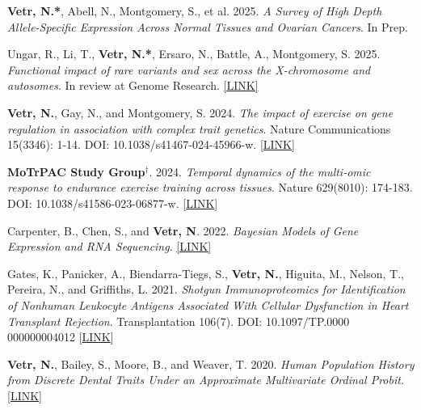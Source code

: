 \documentclass[12pt]{article}
\begin{document}
\begin{enumerate}[label={[\arabic*]}]

\item \textbf{Vetr, N.*}, Abell, N.,  Montgomery, S., et al.  2025.  \emph{A Survey of High Depth Allele-Specific Expression Across Normal Tissues and Ovarian Cancers}.  In Prep.

\item Ungar, R., Li, T., \textbf{Vetr, N.*},  Ersaro, N., Battle, A., Montgomery, S. 2025.  \emph{Functional impact of rare variants and sex across the X-chromosome and autosomes}.  In review at Genome Research.  \href{https://www.biorxiv.org/content/10.1101/2025.01.23.634570v1.abstract}{[LINK]}

\item \textbf{Vetr, N.},  Gay,  N.,  and Montgomery,  S.  2024.  \emph{The impact of exercise on gene regulation in association with complex trait genetics}.  Nature Communications 15(3346): 1-14. DOI: 10.1038/s41467-024-45966-w. [\href{https://doi.org/10.1038/s41467-024-45966-w}{LINK}]

\item \textbf{MoTrPAC Study Group}$^{\dag}$. 2024.  \emph{Temporal dynamics of the multi-omic response to endurance exercise training across tissues}.  Nature 629(8010): 174-183. DOI: 10.1038/s41586-023-06877-w. [\href{https://doi.org/10.1038/s41586-023-06877-w.}{LINK}]

\item  Carpenter,  B.,  Chen,  S.,  and \textbf{Vetr,  N}.  2022.  \emph{Bayesian Models of Gene Expression and RNA Sequencing}.  \href{https://github.com/bob-carpenter/BayesExpress/blob/main/latex/bayes-express/bayes-express.tex}{[LINK]}

\item Gates, K., Panicker, A., Biendarra-Tiegs, S., \textbf{Vetr, N.}, Higuita, M., Nelson, T., Pereira, N., and Griffiths, L. 2021.  \emph{Shotgun Immunoproteomics for Identification of Nonhuman Leukocyte Antigens Associated With Cellular Dysfunction in Heart Transplant Rejection}. Transplantation 106(7). DOI: 10.1097/TP.0000\\000000004012 [\href{https://pubmed.ncbi.nlm.nih.gov/34923540/}{LINK}]

\item \textbf{Vetr, N.}, Bailey, S., Moore, B., and Weaver, T. 2020.  \emph{Human Population History from Discrete Dental Traits Under an Approximate Multivariate Ordinal Probit}. [\href{https://github.com/NikVetr/papers/blob/main/plosone-manuscript/mvBM_manuscript_plosone.pdf}{LINK}]


\end{enumerate}
\end{document}

